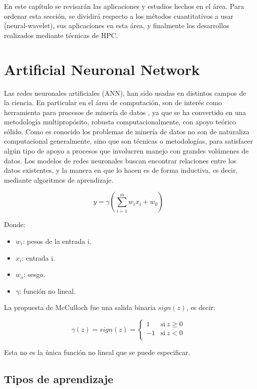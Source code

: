 En este capítulo se revisarán las aplicaciones y estudios hechos en el área. Para ordenar esta sección, se
dividirá respecto a los métodos cuantitativos a usar (neural-wavelet), sus aplicaciones en esta área, y finalmente
los desarrollos realizados mediante técnicas de HPC.

\section{Artificial Neuronal Network}

Las redes neuronales artificiales (ANN), han sido usadas en distintos campos de la ciencia. En particular en el área de computación, son de interés
como herramienta para procesos de minería de datos \cite{bigus1996data}, ya que se ha convertido en una metodología multipropósito, robusta computacionalmente, 
con apoyo teórico sólido. Como es conocido los problemas de minería de datos no son de naturaliza computacional generalmente, sino que son técnicas o metodologías, para
satisfacer algún tipo de apoyo a procesos que involucren manejo con grandes volúmenes de datos. Los modelos de redes neuronales buscan encontrar relaciones entre los datos existentes, y
la manera en que lo hacen es de forma inductiva, es decir, mediante algoritmos de aprendizaje.

$$ y = \gamma \left( \sum_{i = 1}^{m}w_ix_i + w_0 \right) $$

Donde:
\begin{itemize}
	\item $w_i$: pesos de la entrada i.
	\item $x_i$: entrada i.
	\item $w_o$: sesgo.
	\item $\gamma$: función no lineal.
\end{itemize}

La propuesta de McCulloch fue una salida binaria $sign(z)$, es decir:

$$ \gamma(z) = sign(z) = \left\{
	       \begin{array}{ll}
		 1      & \mathrm{si\ } z \ge 0 \\
		 -1	& \mathrm{si\ } z < 0  \\
	       \end{array}
	     \right. $$

Esta no es la única función no lineal que se puede especificar.

\subsection{Tipos de aprendizaje}

